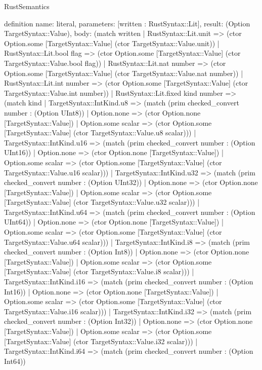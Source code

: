 \begin{lexlean}{RustSemantics}
\begin{semanticmodule}
definition{
  name: literal,
  parameters: [written : RustSyntax::Lit],
  result: (Option TargetSyntax::Value),
  body: (match written
    | RustSyntax::Lit.unit => (ctor Option.some [TargetSyntax::Value] (ctor TargetSyntax::Value.unit))
    | RustSyntax::Lit.bool flag => (ctor Option.some [TargetSyntax::Value] (ctor TargetSyntax::Value.bool flag))
    | RustSyntax::Lit.nat number => (ctor Option.some [TargetSyntax::Value] (ctor TargetSyntax::Value.nat number))
    | RustSyntax::Lit.int number => (ctor Option.some [TargetSyntax::Value] (ctor TargetSyntax::Value.int number))
    | RustSyntax::Lit.fixed kind number => (match kind
      | TargetSyntax::IntKind.u8 => (match (prim checked_convert number : (Option UInt8))
        | Option.none => (ctor Option.none [TargetSyntax::Value])
        | Option.some scalar => (ctor Option.some [TargetSyntax::Value] (ctor TargetSyntax::Value.u8 scalar)))
      | TargetSyntax::IntKind.u16 => (match (prim checked_convert number : (Option UInt16))
        | Option.none => (ctor Option.none [TargetSyntax::Value])
        | Option.some scalar => (ctor Option.some [TargetSyntax::Value] (ctor TargetSyntax::Value.u16 scalar)))
      | TargetSyntax::IntKind.u32 => (match (prim checked_convert number : (Option UInt32))
        | Option.none => (ctor Option.none [TargetSyntax::Value])
        | Option.some scalar => (ctor Option.some [TargetSyntax::Value] (ctor TargetSyntax::Value.u32 scalar)))
      | TargetSyntax::IntKind.u64 => (match (prim checked_convert number : (Option UInt64))
        | Option.none => (ctor Option.none [TargetSyntax::Value])
        | Option.some scalar => (ctor Option.some [TargetSyntax::Value] (ctor TargetSyntax::Value.u64 scalar)))
      | TargetSyntax::IntKind.i8 => (match (prim checked_convert number : (Option Int8))
        | Option.none => (ctor Option.none [TargetSyntax::Value])
        | Option.some scalar => (ctor Option.some [TargetSyntax::Value] (ctor TargetSyntax::Value.i8 scalar)))
      | TargetSyntax::IntKind.i16 => (match (prim checked_convert number : (Option Int16))
        | Option.none => (ctor Option.none [TargetSyntax::Value])
        | Option.some scalar => (ctor Option.some [TargetSyntax::Value] (ctor TargetSyntax::Value.i16 scalar)))
      | TargetSyntax::IntKind.i32 => (match (prim checked_convert number : (Option Int32))
        | Option.none => (ctor Option.none [TargetSyntax::Value])
        | Option.some scalar => (ctor Option.some [TargetSyntax::Value] (ctor TargetSyntax::Value.i32 scalar)))
      | TargetSyntax::IntKind.i64 => (match (prim checked_convert number : (Option Int64))
}
\end{semanticmodule}
\end{lexlean}
